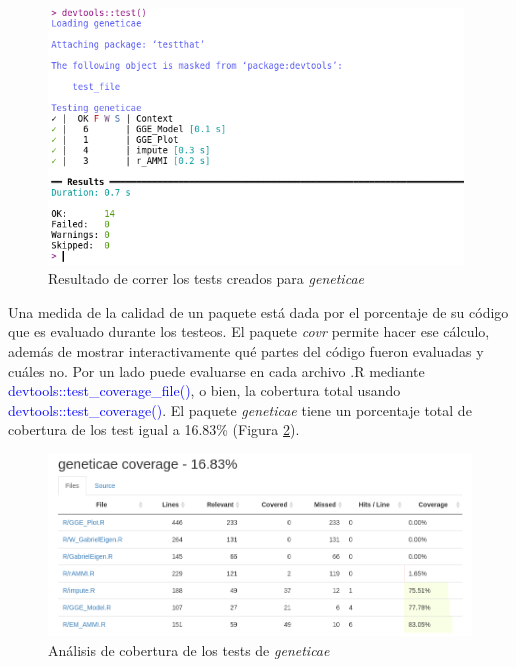 \begin{figure}[H]
	\begin{center}
		\includegraphics[width=11cm]{./Graficos/Test.png}	
	\end{center}
	\caption{Resultado de correr los tests creados para \emph{geneticae}}
	\label{fig:fig34}
\end{figure}

Una medida de la calidad de un paquete está dada por el porcentaje de su código que es evaluado durante los testeos. El paquete \emph{covr} \citep{Hester2020} permite hacer ese cálculo, además de mostrar interactivamente qué partes del código fueron evaluadas y cuáles no. Por un lado puede evaluarse en cada archivo .R mediante \textcolor{blue}{devtools::test\_coverage\_file()}, o bien, la cobertura total usando \textcolor{blue}{devtools::test\_coverage()}. El paquete \emph{geneticae} tiene un porcentaje total de cobertura de los test igual a 16.83\% (Figura \ref{fig:fig35}).

\begin{figure}[H]
	\begin{center}
		\includegraphics[width=14cm]{./Graficos/Cobertura.png}	
	\end{center}
	\caption{Análisis de cobertura de los tests de \emph{geneticae}}
	\label{fig:fig35}
\end{figure}


